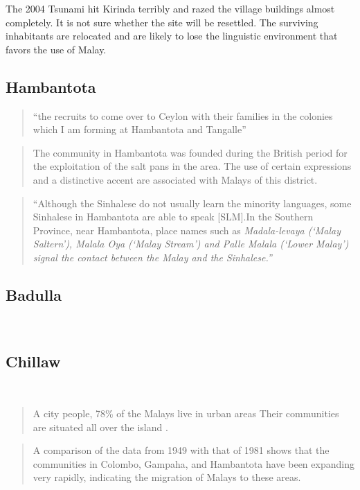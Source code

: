 The 2004 Tsunami hit Kirinda terribly and razed the village buildings almost completely. It is not sure whether the site will be resettled. The surviving inhabitants are relocated and are likely to lose the linguistic environment that favors the use of Malay.
~
\subsection{Hambantota}\label{sec:slmbg:Hambantota}

\begin{quote}
    ``the recruits to come over to Ceylon with their families in the colonies which I am forming at Hambantota and Tangalle''\citet[65]{Hussainmiya1990}
\end{quote}
\begin{quote}The community in Hambantota was founded during the British period for the exploitation of the salt pans in the area. The use of certain expressions and a distinctive accent are associated with Malays of this district\citep[5]{Bichsel}.\end{quote}

\begin{quotation}
    ``Although the Sinhalese do not usually learn the minority languages, some Sinhalese in Hambantota are able to speak [SLM].\el In the Southern Province, near Hambantota, place names such as \em Madala-levaya \em(`Malay Saltern'), \em Malala Oya \em(`Malay Stream') and \em  Palle Malala \em (`Lower Malay') signal the contact between the Malay and the Sinhalese.''\citet[12]{Jayasuriya2002}
\end{quotation}
\subsection{Badulla}\label{sec:slmbg:Badulla}
~
\subsection{Chillaw}\label{sec:slmbg:Chillaw}
\citet[111]{Hussainmiya1990}
~

\begin{quote}
A city people, 78\% of the Malays live in urban areas \citet[75]{Marga1988} Their communities are situated all over the island \citet[2]{Bichsel}.
\end{quote}


\begin{quote}A comparison of the data from 1949 with that of 1981 shows that the communities in Colombo, Gampaha, and Hambantota have been expanding very rapidly, indicating the migration of Malays to these areas.
\end{quote}\citet[2]{Bichsel}

